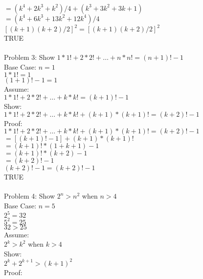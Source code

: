 \documentclass[12pt]{article}
\begin{document}
        \\\indent \indent$=(k^4+2k^3+k^2)/4 + (k^3+3k^2+3k+1)$
        \\\indent \indent$=(k^4+6k^3+13k^2+12k^4)/4$
        \\\indent \indent $[(k+1)(k+2)/2]^2=[(k+1)(k+2)/2]^2$
        \\\indent \indent TRUE 
        \\
        \\Problem 3: Show $1*1! + 2*2! + \ldots + n*n! = (n+1)! - 1 $
        \\\indent Base Case: $n=1$
        \\\indent \indent $1*1! = 1$
        \\\indent \indent $(1+1)! - 1 = 1$
        \\\indent Assume: 
        \\\indent \indent $1*1! + 2*2! + \ldots + k*k! = (k+1)! - 1 $
        \\\indent Show: 
        \\\indent \indent $1*1! + 2*2! + \ldots + k*k! + (k+1)*(k+1)! = (k+2)! - 1 $
        \\\indent Proof:
        \\\indent \indent $1*1! + 2*2! + \ldots + k*k! + (k+1)*(k+1)! = (k+2)! - 1 $
        \\\indent \indent $=[(k+1)! - 1] + (k+1)*(k+1)!$
        \\\indent \indent $=(k+1)! *(1+k+1) -1$
        \\\indent \indent $=(k+1)! *(k+2) -1$
        \\\indent \indent $=(k+2)!-1$
        \\\indent \indent $(k+2)!-1=(k+2)!-1$
        \\\indent \indent TRUE
        \\
        \\Problem 4: Show $ 2^n > n^2 $ when $n > 4$
        \\\indent Base Case: $n=5$
        \\\indent \indent $2^5 = 32$
        \\\indent \indent $5^2 = 25$
        \\\indent \indent $32>25$
        \\\indent Assume:
        \\\indent \indent $ 2^k > k^2 $ when $k > 4$
        \\\indent Show:
        \\\indent \indent $ 2^k + 2^{k+1} > (k+1)^2 $
        \\\indent Proof:
\end{document}
